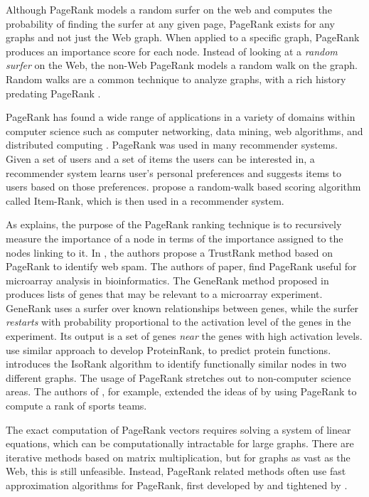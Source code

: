 \documentclass[11pt,oneside]{book}
\begin{document}
Although PageRank models a random surfer on the web and computes the probability of finding the surfer at any given page, PageRank exists for any graphs and not just the Web graph. When applied to a specific graph, PageRank produces an importance score for each node. Instead of looking at a \textit{random surfer} on the Web, the non-Web PageRank models a random walk on the graph. Random walks are a common technique to analyze graphs, with a rich history predating PageRank \citep{spitzer2013principles}.

PageRank has found a wide range of applications in a variety of domains within computer science such as computer networking, data mining, web algorithms, and distributed computing \citep{cook04,Bianchini05,LangvilleM03}.
PageRank was used in many recommender systems. Given a set of users and a set of items the users can be interested in, a recommender system learns user's personal preferences and suggests items to users based on those preferences. \citep{gori2006random} propose a random-walk based scoring algorithm called Item-Rank, which is then used in a recommender system.

As \citep{franceschet2011pagerank} explains, the purpose of the PageRank ranking technique is to recursively measure the importance of a node in terms of the importance assigned to the nodes linking to it. In \citep{gyongyi2004combating}, the authors propose a TrustRank method based on PageRank to identify web spam. The authors of \citep{morrison2005generank} paper, find PageRank useful for microarray analysis in bioinformatics. The GeneRank method proposed in \citep{morrison2005generank} produces lists of genes that may be relevant to a microarray experiment. GeneRank uses a surfer over known relationships between genes, while the surfer \textit{restarts} with probability proportional to the activation level of the genes in the experiment. Its output is a set of genes \textit{near} the genes with high activation levels. \citep{freschi2007protein} use similar approach to develop ProteinRank, to predict protein functions. \citep{singh2007pairwise} introduces the IsoRank algorithm to identify functionally similar nodes in two different graphs. The usage of PageRank stretches out to non-computer science areas. The authors of \citep{govan2009offense}, for example,  extended the ideas of \citep{keener1993perron} by using PageRank to compute a rank of sports teams.

The exact computation of PageRank vectors requires solving a system of linear equations, which can be computationally intractable for large graphs. There are iterative methods based on matrix multiplication, but for graphs as vast as the Web, this is still unfeasible. Instead, PageRank related methods often use fast approximation algorithms for PageRank, first developed by \citep{andersen2006local} and tightened by \citep{chung2010sharp}.
\end{document}
